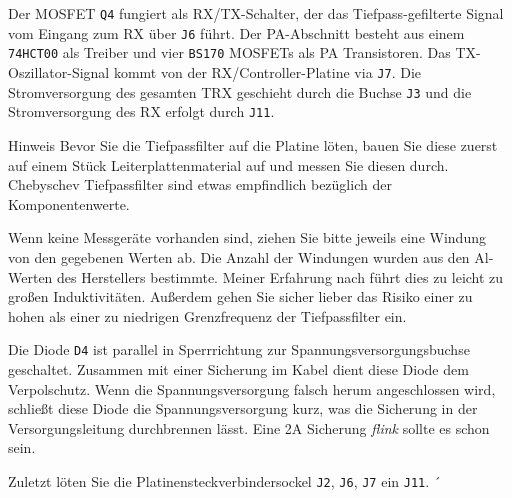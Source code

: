 \documentclass[10pt, a4paper,twoside]{scrartcl}
\newenvironment{remark}{\begin{bclogo}[couleur=blue!30,arrondi=.1,logo=\bcinfo,ombre=true]{Hinweis}}{\end{bclogo}}
\begin{document}
Der MOSFET \texttt{Q4} fungiert als RX/TX-Schalter, der das Tiefpass-gefilterte Signal vom Eingang zum RX über \texttt{J6} führt. Der PA-Abschnitt besteht aus einem \texttt{74HCT00} als Treiber und vier \texttt{BS170} MOSFETs als PA Transistoren. Das TX-Oszillator-Signal kommt von der RX/Controller-Platine via \texttt{J7}. Die Stromversorgung des gesamten TRX geschieht durch die Buchse \texttt{J3} und die Stromversorgung des RX erfolgt durch \texttt{J11}.

\begin{remark}
 Bevor Sie die Tiefpassfilter auf die Platine löten, bauen Sie diese zuerst auf einem Stück Leiterplattenmaterial auf und messen Sie diesen durch. Chebyschev Tiefpassfilter sind etwas empfindlich bezüglich der Komponentenwerte.
\end{remark}

 Wenn keine Messgeräte vorhanden sind, ziehen Sie bitte jeweils eine Windung von den gegebenen Werten ab. Die Anzahl der Windungen wurden aus den Al-Werten des Herstellers bestimmte. Meiner Erfahrung nach führt dies zu leicht zu großen Induktivitäten. Außerdem gehen Sie sicher lieber das Risiko einer zu hohen als einer zu niedrigen Grenzfrequenz der Tiefpassfilter ein. 
 
 Die Diode \texttt{D4} ist parallel in Sperrrichtung zur Spannungsversorgungsbuchse geschaltet. Zusammen mit einer Sicherung im Kabel dient diese Diode dem Verpolschutz. Wenn die Spannungsversorgung falsch herum angeschlossen wird, schließt diese Diode die Spannungsversorgung kurz, was die Sicherung in der Versorgungsleitung durchbrennen lässt. Eine 2A Sicherung \emph{flink} sollte es schon sein. 

 Zuletzt löten Sie die Platinensteckverbindersockel \texttt{J2}, \texttt{J6}, \texttt{J7} ein \texttt{J11}.
´ 
\clearpage
\end{document}
